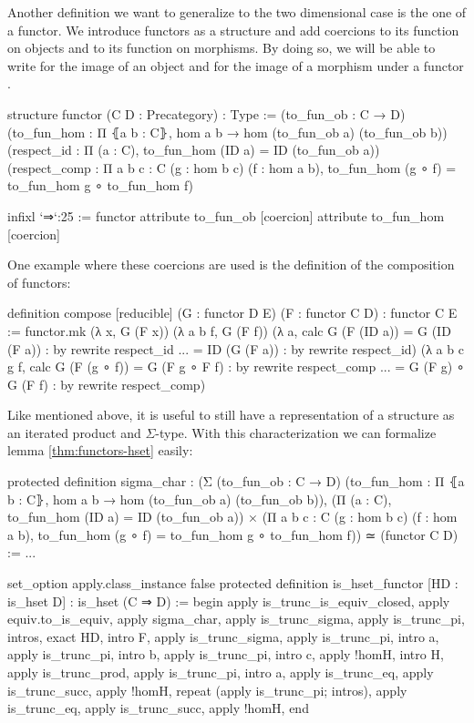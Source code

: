 Another definition we want to generalize to the two dimensional case is the one
of a functor.
We introduce functors as a structure and add coercions to its function on objects
and to its function on morphisms.
By doing so, we will be able to write  for the image of an object 
and  for the image of a morphism  under a functor .
\begin{leancode}
structure functor (C D : Precategory) : Type :=
  (to_fun_ob : C → D)
  (to_fun_hom : Π ⦃a b : C⦄, hom a b → hom (to_fun_ob a) (to_fun_ob b))
  (respect_id : Π (a : C), to_fun_hom (ID a) = ID (to_fun_ob a))
  (respect_comp : Π {a b c : C} (g : hom b c) (f : hom a b),
    to_fun_hom (g ∘ f) = to_fun_hom g ∘ to_fun_hom f)

infixl `⇒`:25 := functor
attribute to_fun_ob [coercion]
attribute to_fun_hom [coercion]
\end{leancode}

One example where these coercions are used is the definition of the composition
of functors:
\begin{leancode}
definition compose [reducible] (G : functor D E) (F : functor C D) :
  functor C E :=
functor.mk
  (λ x, G (F x))
  (λ a b f, G (F f))
  (λ a, calc
    G (F (ID a)) = G (ID (F a)) : by rewrite respect_id
             ... = ID (G (F a)) : by rewrite respect_id)
  (λ a b c g f, calc
    G (F (g ∘ f)) = G (F g ∘ F f)     : by rewrite respect_comp
              ... = G (F g) ∘ G (F f) : by rewrite respect_comp)
\end{leancode}

Like mentioned above, it is useful to still have a representation of a structure
as an iterated product and $\Sigma$-type.
With this characterization we can formalize lemma \ref{thm:functors-hset} easily:
\begin{leancode}
protected definition sigma_char :
  (Σ (to_fun_ob : C → D)
  (to_fun_hom : Π ⦃a b : C⦄, hom a b → hom (to_fun_ob a) (to_fun_ob b)),
  (Π (a : C), to_fun_hom (ID a) = ID (to_fun_ob a)) ×
  (Π {a b c : C} (g : hom b c) (f : hom a b),
    to_fun_hom (g ∘ f) = to_fun_hom g ∘ to_fun_hom f)) ≃ (functor C D) :=
...

set_option apply.class_instance false
protected definition is_hset_functor [HD : is_hset D] : is_hset (C ⇒ D) :=
begin
  apply is_trunc_is_equiv_closed, apply equiv.to_is_equiv,
    apply sigma_char,
  apply is_trunc_sigma, apply is_trunc_pi, intros, exact HD, intro F,
  apply is_trunc_sigma, apply is_trunc_pi, intro a,
    {apply is_trunc_pi, intro b,
     apply is_trunc_pi, intro c, apply !homH},
  intro H, apply is_trunc_prod,
    {apply is_trunc_pi, intro a,
     apply is_trunc_eq, apply is_trunc_succ, apply !homH},
    {repeat (apply is_trunc_pi; intros),
     apply is_trunc_eq, apply is_trunc_succ, apply !homH},
end
\end{leancode}

